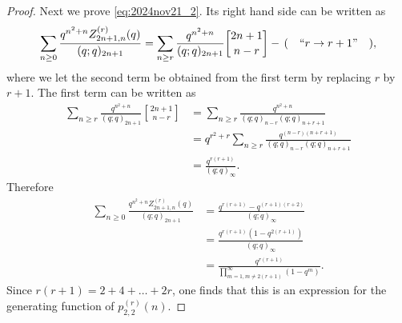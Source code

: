 \documentclass[10pt,a4paper]{amsart}
\newcommand{\red}[1]{\textcolor{black}{#1}}
\begin{document}
\begin{proof}
Next we prove \eqref{eq:2024nov21_2}.
Its right hand side can be written as
\begin{equation*}
\sum_{n \geq 0} \frac{q^{n^2+n} Z_{2n+1,n}^{(r)}(q)}{(q;q)_{2n+1}} =
\sum_{n \geq r} \frac{q^{n^2+n} }{(q;q)_{2n+1}} { 2n+1 \brack n-r } \\
- \, ( \quad ``r \rightarrow r + 1" \quad ),
\end{equation*}
where we let the second term be obtained from the first term
by replacing $r$ by $r +1$.
The first term can be written as
\red{
\begin{align}
\sum_{n \geq r} \frac{q^{n^2+n} }{(q;q)_{2n+1}} { 2n+1 \brack n-r }  &=
\sum_{n \geq r} \frac{q^{n^2+n} }{(q;q)_{n-r} (q;q)_{n+r+1}} \nonumber\\
&=q^{r^2+r}\sum_{n \geq r} \frac{q^{(n-r)(n+r+1)} }{(q;q)_{n-r} (q;q)_{n+r+1}} \nonumber\\
&= 
\frac{q^{r(r+1)}}{(q;q)_{\infty}}.\label{eq:2025june23_2}
\end{align}
}
Therefore
\begin{align*}
\sum_{n \geq 0} \frac{q^{n^2+n} Z_{2n+1,n}^{(r)}(q)}{(q;q)_{2n+1}} &=
\frac{q^{r(r+1)} - q^{(r+1)(r + 2)}}{(q;q)_{\infty}} \\
&= 
\frac{q^{r(r+1)}(1 - q^{2(r+1)})}{(q;q)_{\infty}} \\
&= \frac{q^{r(r+1)}}{\prod_{m=1, m \ne 2(r+1)}^\infty (1-q^m)}.
\end{align*}
Since $r(r+1) = 2 + 4 + \dots + 2 r$, one finds that
this is an expression for the generating function of $p^{(r)}_{2,2}(n)$.
\end{proof}
\end{document}
